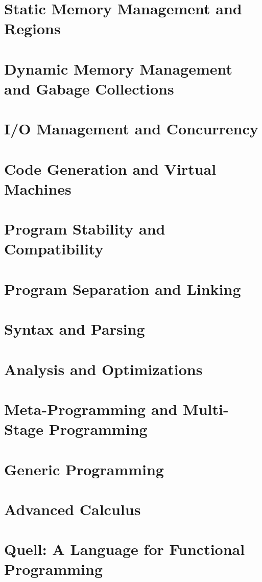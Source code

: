 \documentclass[
  luatex,
  japanese,
  unicode,
  titlepage,
  pdfusetitle
]{ltjsbook}
\begin{document}
\chapter{Static Memory Management and Regions}

\chapter{Dynamic Memory Management and Gabage Collections}

\chapter{I/O Management and Concurrency}

\chapter{Code Generation and Virtual Machines}

\chapter{Program Stability and Compatibility}

\chapter{Program Separation and Linking}

\chapter{Syntax and Parsing}






\chapter{Analysis and Optimizations}

\chapter{Meta-Programming and Multi-Stage Programming}

\chapter{Generic Programming}

\chapter{Advanced Calculus}

\chapter{Quell: A Language for Functional Programming}






\end{document}
